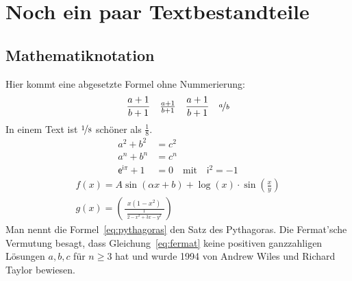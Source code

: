

\chapter{Noch ein paar Textbestandteile}
 
 \section{Mathematiknotation}

Hier kommt eine abgesetzte Formel ohne Nummerierung:
%
\begin{align*}
\frac{a+1}{b+1} \quad \tfrac{a+1}{b+1} \quad  \dfrac{a+1}{b+1} \quad \nicefrac{a}{b}
\end{align*}
%
In einem Text ist $\nicefrac{1}{8}$ schöner als $\frac{1}{8}$. 
%	
\begin{align}
\label{eq:pythagoras} a^2 + b^2  & = c^2 \\ 
\label{eq:fermat} a^n + b^n & = c^n \\ 
\label{eq:schoen} \textsf{e}^{\textsf{i}\pi} +1 & = 0 \quad \text{mit} \quad  \textsf{i}^2  = -1   
\end{align}	
%
\begin{align}
f(x) = A \sin(\alpha x + b) + \log(x) \cdot \sin\left(\frac{x}{y}\right) \\
g(x) = \left(\frac{\ \ x (1-x^2)\ \ }{\frac{1}{2-x^2 +3x -y^2}} \right)
\end{align}
%	
Man nennt die Formel~\eqref{eq:pythagoras} den Satz des Pythagoras. Die Fermat'sche Vermutung besagt, dass Gleichung~\eqref{eq:fermat} keine positiven ganzzahligen Lösungen $a, b, c$ für $n \ge 3$ hat und wurde 1994 von Andrew Wiles und Richard Taylor bewiesen. 

